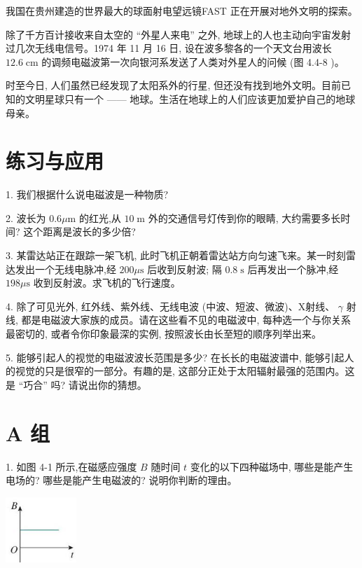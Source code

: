 \documentclass[10pt]{article}
\begin{document}
我国在贵州建造的世界最大的球面射电望远镜FAST 正在开展对地外文明的探索。

除了千方百计接收来自太空的 “外星人来电” 之外, 地球上的人也主动向宇宙发射过几次无线电信号。1974 年 11 月 16 日, 设在波多黎各的一个天文台用波长 \({12.6}\mathrm{\;{cm}}\) 的调频电磁波第一次向银河系发送了人类对外星人的问候 (图 4.4-8 )。

时至今日, 人们虽然已经发现了太阳系外的行星, 但还没有找到地外文明。目前已知的文明星球只有一个 —— 地球。生活在地球上的人们应该更加爱护自己的地球母亲。

\section*{练习与应用}

1. 我们根据什么说电磁波是一种物质?

2. 波长为 \({0.6\mu }\mathrm{m}\) 的红光,从 \({10}\mathrm{\;m}\) 外的交通信号灯传到你的眼睛, 大约需要多长时间? 这个距离是波长的多少倍?

3. 某雷达站正在跟踪一架飞机, 此时飞机正朝着雷达站方向匀速飞来。某一时刻雷达发出一个无线电脉冲,经 \({200\mu }\mathrm{s}\) 后收到反射波; 隔 \({0.8}\mathrm{\;s}\) 后再发出一个脉冲,经 \({198\mu }\mathrm{s}\) 收到反射波。求飞机的飞行速度。

4. 除了可见光外, 红外线、紫外线、无线电波 (中波、短波、微波)、X射线、 \(\gamma\) 射线, 都是电磁波大家族的成员。请在这些看不见的电磁波中, 每种选一个与你关系最密切的, 或者令你印象最深的实例, 按照波长由长至短的顺序列举出来。

5. 能够引起人的视觉的电磁波波长范围是多少? 在长长的电磁波谱中, 能够引起人的视觉的只是很窄的一部分。有趣的是, 这部分正处于太阳辐射最强的范围内。这是 “巧合” 吗? 请说出你的猜想。

\section*{A 组}

1. 如图 4-1 所示,在磁感应强度 \(B\) 随时间 \(t\) 变化的以下四种磁场中, 哪些是能产生电场的? 哪些是能产生电磁波的? 说明你判断的理由。

\begin{center}
\includegraphics[max width=0.2\textwidth]{images/01910e72-c5b7-7ed5-a6d4-fb3a5faefc32_93_572899.jpg}
\end{center}
\end{document}

